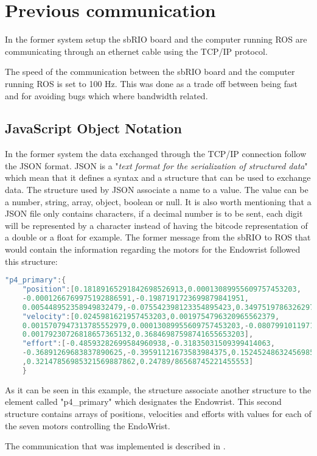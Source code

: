

 \section{Previous communication}\label{sec:prev_communication}
In the former system setup the sbRIO board and the computer running ROS are communicating through an ethernet cable using the TCP/IP protocol.

The speed of the communication between the sbRIO board and the computer running ROS is set to 100 Hz. This was done as a trade off between being fast and for avoiding bugs which where bandwidth related\cite{Chris_Surgical}.

\subsection{JavaScript Object Notation}\label{subsec:JSON}
In the former system the data exchanged through the TCP/IP connection follow the \gls{JSON} format. \gls{JSON} is a "\textit{text format for the serialization of structured data}"\cite{JSON_IETF} which mean that it defines a syntax and a structure that can be used to exchange data. The structure used by \gls{JSON} associate a name to a value. The value can be a number, string, array, object, boolean or null. It is also worth mentioning that a \gls{JSON} file only contains characters, if a decimal number is to be sent, each digit will be represented by a character instead of having the bitcode representation of a double or a float for example. The former message from the sbRIO to ROS that would contain the information regarding the motors for the Endowrist followed this structure:

\begin{lstlisting}[language=C]
"p4_primary":{
	"position":[0.18189165291842698526913,0.00013089955609757453203,
	-0.0001266769975192886591,-0.1987191723699879841951,
	0.005448952358949832479,-0.075542398123354895423,0.34975197863262971333179],
	"velocity":[0.0245981621957453203,0.0019754796320965562379,
	0.0015707947313785552979,0.00013089955609757453203,-0.08079910119712697,
	0.00179230726818657365132,0.36846987598741655653203],
	"effort":[-0.48593282699584960938,-0.31835031509399414063,
	-0.36891269683837890625,-0.39591121673583984375,0.15245248632456985325663
	,0.32147856985321569887862,0.24789/86568745221455553]
	}
\end{lstlisting}

As it can be seen in this example, the structure associate another structure to the element called "p4\_primary" which designates the Endowrist. This second structure contains arrays of positions, velocities and efforts with values for each of the seven motors controlling the EndoWrist.

The communication that was implemented is described in .%